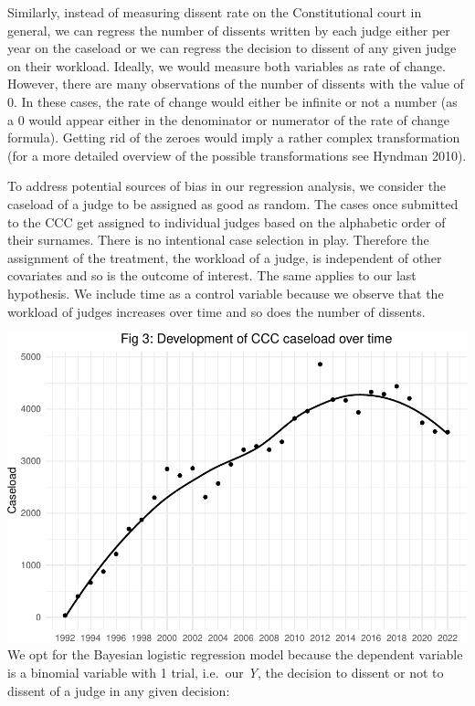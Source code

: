 \documentclass[
  11pt,
]{article}
\begin{document}
Similarly, instead of measuring dissent rate on the Constitutional court
in general, we can regress the number of dissents written by each judge
either per year on the caseload or we can regress the decision to
dissent of any given judge on their workload. Ideally, we would measure
both variables as rate of change. However, there are many observations
of the number of dissents with the value of 0. In these cases, the rate
of change would either be infinite or not a number (as a 0 would appear
either in the denominator or numerator of the rate of change formula).
Getting rid of the zeroes would imply a rather complex transformation
(for a more detailed overview of the possible transformations see
Hyndman 2010).

To address potential sources of bias in our regression analysis, we
consider the caseload of a judge to be assigned as good as random. The
cases once submitted to the CCC get assigned to individual judges based
on the alphabetic order of their surnames. There is no intentional case
selection in play. Therefore the assignment of the treatment, the
workload of a judge, is independent of other covariates and so is the
outcome of interest. The same applies to our last hypothesis. We include
time as a control variable because we observe that the workload of
judges increases over time and so does the number of dissents.

\vspace{10pt}

\includegraphics{dissents_article-anonymised_files/figure-latex/caseload_over_time-1.pdf}
We opt for the Bayesian logistic regression model because the dependent
variable is a binomial variable with 1 trial, i.e.~our \emph{Y}, the
decision to dissent or not to dissent of a judge in any given decision:
\end{document}
